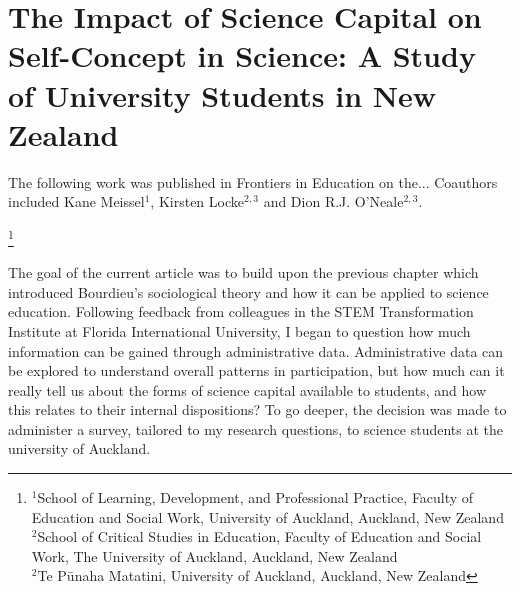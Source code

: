 \chapter[The Impact of Science Capital on Self-Concept in Science][]{The Impact of Science Capital on Self-Concept in Science: A Study of University Students in New Zealand}

The following work was published in Frontiers in Education on the... Coauthors included Kane Meissel$^1$, Kirsten Locke$^{2,3}$ and Dion R.J. O'Neale$^{2,3}$. 

\footnote{$^{1}$School of Learning, Development, and Professional Practice, Faculty of Education and Social Work, University of Auckland, Auckland, New Zealand \\
$^{2}$School of Critical Studies in Education, Faculty of Education and Social Work, The University of Auckland, Auckland, New Zealand \\
$^{2}$Te P\={u}naha Matatini, University of Auckland, Auckland, New Zealand }

The goal of the current article was to build upon the previous chapter which introduced Bourdieu's sociological theory and how it can be applied to science education. Following feedback from colleagues in the STEM Transformation Institute at Florida International University, I began to question how much information can be gained through administrative data. Administrative data can be explored to understand overall patterns in participation, but how much can it really tell us about the forms of science capital available to students, and how this relates to their internal dispositions? To go deeper, the decision was made to administer a survey, tailored to my research questions, to science students at the university of Auckland.


